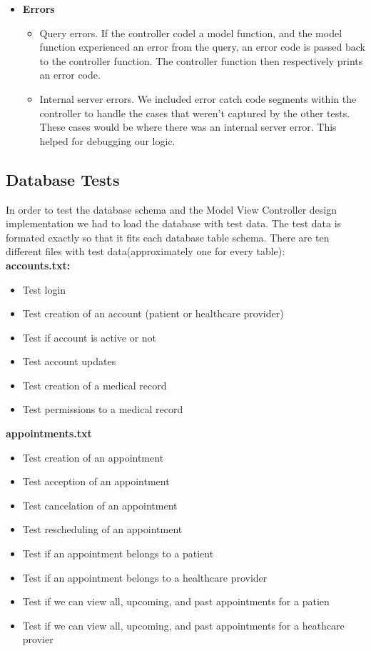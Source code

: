 \documentclass[12pt]{report}
\begin{document}
\begin{itemize}
\begin{itemize}
\end{itemize}
\item \textbf{Errors}
\begin{itemize} 
\item Query errors. If the controller codel a model function, and the model function experienced an error from the query, an error code is passed back to the controller function. The controller function then respectively prints an error code. 
\item Internal server errors. We included error catch code segments within the controller to handle the cases that weren't captured by the other tests. These cases would be where there was an internal server error. This helped for debugging our logic.  
\end{itemize}
\end{itemize}

\subsection{Database Tests}

In order to test the database schema and the Model View Controller design implementation we had to load the database with test data.  The test data is formated exactly so that it fits each database table schema.  There are ten different files with test data(approximately one for every table):\\

\textbf{accounts.txt:}
\begin{itemize}
\item Test login
\item Test creation of an account (patient or healthcare provider)
\item Test if account is active or not
\item Test account updates
\item Test creation of a medical record
\item Test permissions to a medical record
\end{itemize}

\textbf{appointments.txt}
\begin{itemize}
\item Test creation of an appointment
\item Test acception of an appointment
\item Test cancelation of an appointment
\item Test rescheduling of an appointment
\item Test if an appointment belongs to a patient
\item Test if an appointment belongs to a healthcare provider
\item Test if we can view all, upcoming, and past appointments for a patien
\item Test if we can view all, upcoming, and past appointments for a heathcare provier
\end{itemize}
\end{document}
